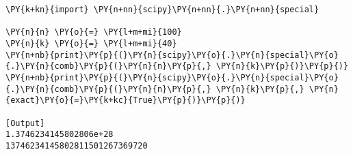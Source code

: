 \begin{Verbatim}[label=\makebox{\href{https://bitbucket.org/lbaldini/statnotes/src/master/snippets/scipy.special.comb.py}{https://bitbucket.org/.../scipy.special.comb.py}},commandchars=\\\{\}]
\PY{k+kn}{import} \PY{n+nn}{scipy}\PY{n+nn}{.}\PY{n+nn}{special}

\PY{n}{n} \PY{o}{=} \PY{l+m+mi}{100}
\PY{n}{k} \PY{o}{=} \PY{l+m+mi}{40}
\PY{n+nb}{print}\PY{p}{(}\PY{n}{scipy}\PY{o}{.}\PY{n}{special}\PY{o}{.}\PY{n}{comb}\PY{p}{(}\PY{n}{n}\PY{p}{,} \PY{n}{k}\PY{p}{)}\PY{p}{)}
\PY{n+nb}{print}\PY{p}{(}\PY{n}{scipy}\PY{o}{.}\PY{n}{special}\PY{o}{.}\PY{n}{comb}\PY{p}{(}\PY{n}{n}\PY{p}{,} \PY{n}{k}\PY{p}{,} \PY{n}{exact}\PY{o}{=}\PY{k+kc}{True}\PY{p}{)}\PY{p}{)}

[Output]
1.3746234145802806e+28
13746234145802811501267369720
\end{Verbatim}